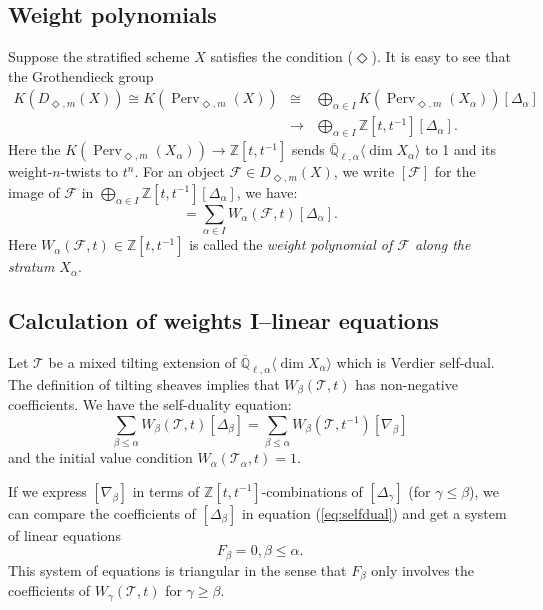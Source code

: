 \documentclass{amsart}
\theoremstyle{plain}
\theoremstyle{definition}
\theoremstyle{remark}
\numberwithin{equation}{subsection}
\begin{document}
\subsection{Weight polynomials}\label{ss:wp} Suppose the stratified scheme $X$ satisfies the condition ($\Diamond$). It is easy to see that the Grothendieck group
\begin{eqnarray*}
K({D_{\Diamond,m}({X})})\cong K({\operatorname{Perv}_{\Diamond,m}({X})})&\cong&\bigoplus_{\alpha\in I}K({\operatorname{Perv}_{\Diamond,m}({X_\alpha})})[\Delta_\alpha]\\
&\to&\bigoplus_{\alpha\in I}{\mathbb{Z}}[t,t^{-1}][\Delta_\alpha].
\end{eqnarray*}
Here the $K({\operatorname{Perv}_{\Diamond,m}({X_\alpha})})\to{\mathbb{Z}}[t,t^{-1}]$ sends ${\overline{\mathbb{Q}}_{\ell,\alpha}{\langle{{\dim X_\alpha}}\rangle}}$ to 1 and its weight-$n$-twists to $t^n$. For an object ${\mathcal{F}}\in{D_{\Diamond,m}({X})}$, we write $[{\mathcal{F}}]$ for the image of ${\mathcal{F}}$ in $\bigoplus_{\alpha\in I}{\mathbb{Z}}[t,t^{-1}][\Delta_\alpha]$, we have:
\begin{equation*}
[{\mathcal{F}}]=\sum_{\alpha\in I}W_\alpha({\mathcal{F}},t)[\Delta_\alpha].
\end{equation*}
Here $W_\alpha({\mathcal{F}},t)\in{\mathbb{Z}}[t,t^{-1}]$ is called the {\em weight polynomial of ${\mathcal{F}}$ along the stratum $X_\alpha$}.

\subsection{Calculation of weights I--linear equations}\label{ss:cal1} Let ${\mathcal{T}}$ be a mixed tilting extension of ${\overline{\mathbb{Q}}_{\ell,\alpha}{\langle{{\dim X_\alpha}}\rangle}}$ which is Verdier self-dual. The definition of tilting sheaves implies that $W_\beta({\mathcal{T}},t)$ has non-negative coefficients. We have the self-duality equation:
\begin{equation}\label{eq:selfdual}
\sum_{\beta\leq\alpha}W_\beta({\mathcal{T}},t)[\Delta_\beta]=\sum_{\beta\leq\alpha}W_\beta({\mathcal{T}},t^{-1})[\nabla_\beta]
\end{equation}
and the initial value condition $W_\alpha({\mathcal{T}}_{\alpha},t)=1$.

If we express $[\nabla_\beta]$ in terms of ${\mathbb{Z}}[t,t^{-1}]$-combinations of $[\Delta_\gamma]$ (for $\gamma\leq\beta$), we can compare the coefficients of $[\Delta_\beta]$ in equation (\ref{eq:selfdual}) and get a system of linear equations
\begin{equation}\label{eq:tri}
F_\beta=0, \beta\leq\alpha.
\end{equation}
This system of equations is triangular in the sense that $F_\beta$ only involves the coefficients of $W_\gamma({\mathcal{T}},t)$ for $\gamma\geq\beta$.
\end{document}
